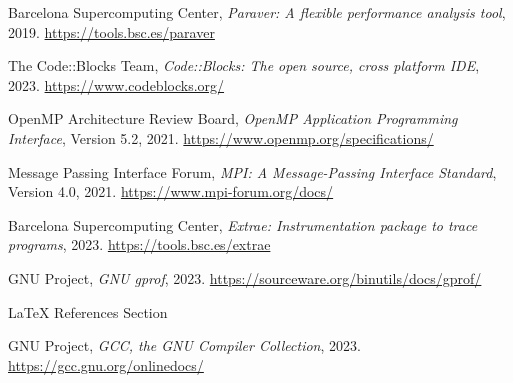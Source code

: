 \documentclass[a4paper, 10pt, onecolumn]{IEEEtran}
\begin{document}
\begin{thebibliography}{7}
  Barcelona Supercomputing Center,
  \textit{Paraver: A flexible performance analysis tool},
  2019.
  \url{https://tools.bsc.es/paraver}
  
  The Code::Blocks Team,
  \textit{Code::Blocks: The open source, cross platform IDE},
  2023.
  \url{https://www.codeblocks.org/}
  
  OpenMP Architecture Review Board,
  \textit{OpenMP Application Programming Interface},
  Version 5.2,
  2021.
  \url{https://www.openmp.org/specifications/}
  
  Message Passing Interface Forum,
  \textit{MPI: A Message-Passing Interface Standard},
  Version 4.0,
  2021.
  \url{https://www.mpi-forum.org/docs/}
  
  Barcelona Supercomputing Center,
  \textit{Extrae: Instrumentation package to trace programs},
  2023.
  \url{https://tools.bsc.es/extrae}
  
  GNU Project,
  \textit{GNU gprof},
  2023.
  \url{https://sourceware.org/binutils/docs/gprof/}
  
  LaTeX References Section
  
  GNU Project,
  \textit{GCC, the GNU Compiler Collection},
  2023.
  \url{https://gcc.gnu.org/onlinedocs/}
\end{thebibliography}
\end{document}
